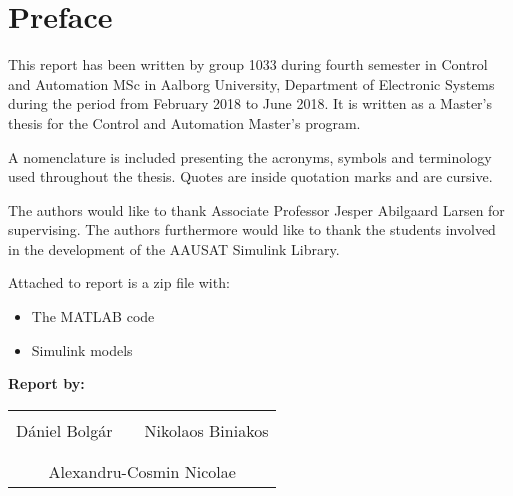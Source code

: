 \chapter*{Preface}
This report has been written by group 1033 during fourth semester in Control and Automation MSc in Aalborg University, Department of Electronic Systems during the period from February 2018 to June 2018. It is written as a Master's thesis for the Control and Automation Master's program. 

A nomenclature is included presenting the acronyms, symbols and terminology used throughout the thesis.  Quotes are inside quotation marks and are cursive.

The authors would like to thank Associate Professor Jesper Abilgaard Larsen for supervising. The authors furthermore would like to thank the students involved in the development of the AAUSAT Simulink Library.

Attached to report is a zip file with:
\begin{itemize}
	\item The MATLAB code 
	\item Simulink models
\end{itemize}
\vspace{2cm}

\textbf{Report by:}\\
\vspace{-5pt}
\begin{table}[H]
	\centering
	\begin{tabular}{c c c}
		\underline{\phantom{JAERJAERJAERJAERGO}} & \phantom{cookies} & \underline{\phantom{JAERJAERJAERJAERGO}} \\
		 	Dániel Bolgár	& \phantom{cookies} &  Nikolaos Biniakos	\\
		&&\\
		\multicolumn{3}{c}{\underline{\phantom{JAERJAERJAERJAERGO}}}\\
		\multicolumn{3}{c}{Alexandru-Cosmin Nicolae}\\				
						
	\end{tabular}
\end{table}


\pagebreak
